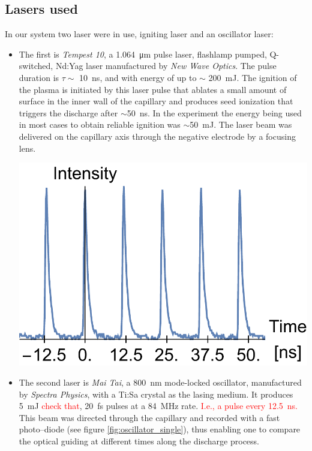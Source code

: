 \documentclass[justified,nofonts,nobib,openany]{tufte-book}
\begin{document}
\subsection{Lasers used}\label{ssec:lasers}
In our system two laser were in use, igniting laser and an oscillator laser:
\begin{itemize}
\item The first is \textit{Tempest 10}, a \SI{1.064}{\um} pulse laser, flashlamp pumped, Q-switched, Nd:Yag laser manufactured by \textit{New Wave Optics}. The pulse duration is $\tau \sim$ \SI{10}{\ns}, and with energy of up to $\sim$ \SI{200}{\mJ}. The ignition of the plasma is initiated by this laser pulse that ablates a small amount of surface in the inner wall of the capillary and produces seed ionization that triggers the discharge after $\sim$\SI{50}{\ns}. In the experiment the energy being used in most cases to obtain reliable ignition was $\sim$\SI{50}{\mJ}. The laser beam was delivered on the capillary axis through the negative electrode by a focusing lens.
\begin{marginfigure}
\includegraphics[width=\marginparwidth]{figures/oscillator/single.pdf}
\label{fig:oscillator_single}
\caption{Oscillator laser, \SI{84}{\MHz} temporal beam profile.}
\end{marginfigure}
\item The second laser is \textit{Mai Tai}, a \SI{800}{\nm} mode-locked oscillator, manufactured by \textit{Spectra Physics}, with a Ti:Sa crystal as the lasing medium.
It produces \SI{5}{\mJ} \textcolor{red}{check that}, \SI{20}{\fs} pulses at a \SI{84}{\MHz} rate. \textcolor{red}{I.e., a pulse every \SI{12.5}{\ns}.} This beam was directed through the capillary and recorded with a fast photo--diode (see figure \ref{fig:oscillator_single}), thus enabling one to compare the optical guiding at different times along the discharge process.
\end{itemize}
\end{document}
